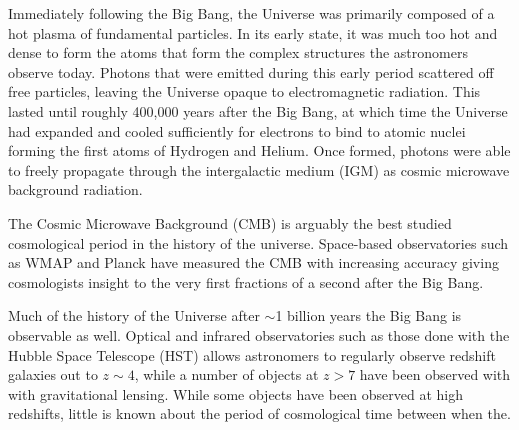 Immediately following the Big Bang, the Universe was primarily composed of a hot plasma of fundamental particles. In its early state, it was much too hot and dense to form the atoms that form the complex structures the astronomers observe today. Photons that were emitted during this early period scattered off free particles, leaving the Universe opaque to electromagnetic radiation. This lasted until roughly 400,000 years after the Big Bang, at which time the Universe had expanded and cooled sufficiently for electrons to bind to atomic nuclei forming the first atoms of Hydrogen and Helium. Once formed, photons were able to freely propagate through the intergalactic medium (IGM) as cosmic microwave background radiation.

The Cosmic Microwave Background (CMB) is arguably the best studied cosmological period in the
history of the universe. Space-based observatories such as WMAP and Planck have measured the
CMB with increasing accuracy giving cosmologists insight to the very first fractions
of a second after the Big Bang.

Much of the history of the Universe after $\sim$1 billion years the Big Bang is observable as well. Optical and infrared observatories such as those done with the Hubble Space Telescope (HST) allows astronomers to regularly observe redshift galaxies out to $z \sim 4$, while a
number of objects at $z > 7$ have been observed with with gravitational lensing. While some objects have been observed at high redshifts, little is known about the period of cosmological time between when the.
